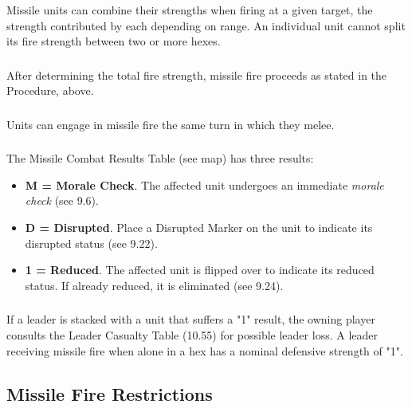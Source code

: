 \subsubsection[Combined Fire]{} Missile units can combine their strengths when firing at a given target, the strength contributed by each depending on range. An individual unit cannot split its fire strength between two or more hexes.

\subsubsection[Missile Procedure]{} After determining the total fire strength, missile fire proceeds as stated in the Procedure, above.

\subsubsection[Melee and Missile]{} Units can engage in missile fire the same turn in which they melee.

\subsubsection[Missile Fire Results]{} The Missile Combat Results Table (see map) has three results:

\begin{itemize}
  \item \textbf{M = Morale Check}. The affected unit undergoes an immediate \textit{morale check} (see 9.6).
  \item \textbf{D = Disrupted}. Place a Disrupted Marker on the unit to indicate its disrupted status (see 9.22).
  \item \textbf{1 = Reduced}. The affected unit is flipped over to indicate its reduced status. If already reduced, it is eliminated (see 9.24).
\end{itemize}

\subsubsection[Leaders]{} If a leader is stacked with a unit that suffers a "1" result, the owning player consults the Leader Casualty Table (10.55) for possible leader loss. A leader receiving missile fire when alone in a hex has a nominal defensive strength of "1".

\subsection{Missile Fire Restrictions}

